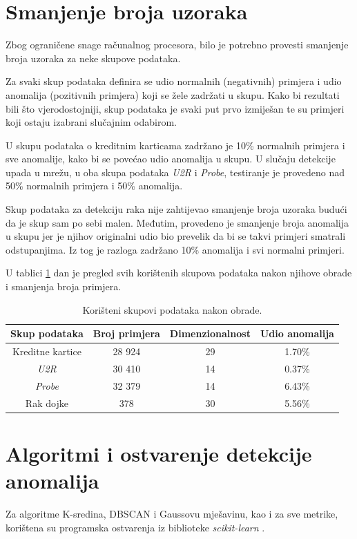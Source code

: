 \documentclass[utf8, diplomski, numeric]{fer}
\begin{document}
\section{Smanjenje broja uzoraka}
Zbog ograničene snage računalnog procesora, bilo je potrebno provesti smanjenje broja uzoraka za neke skupove podataka. 

Za svaki skup podataka definira se udio normalnih (negativnih) primjera i udio anomalija (pozitivnih primjera) koji se žele zadržati u skupu. Kako bi rezultati bili što vjerodostojniji, skup podataka je svaki put prvo izmiješan te su primjeri koji ostaju izabrani slučajnim odabirom. 

U skupu podataka o kreditnim karticama zadržano je 10\% normalnih primjera i sve anomalije, kako bi se povećao udio anomalija u skupu. U slučaju detekcije upada u mrežu, u oba skupa podataka \textit{U2R} i \textit{Probe}, testiranje je provedeno nad 50\% normalnih primjera i 50\% anomalija.

Skup podataka za detekciju raka nije zahtijevao smanjenje broja uzoraka budući da je skup sam po sebi malen. Međutim, provedeno je smanjenje broja anomalija u skupu jer je njihov originalni udio bio prevelik da bi se takvi primjeri smatrali odstupanjima. Iz tog je razloga zadržano 10\% anomalija i svi normalni primjeri.

U tablici \ref{tab:datasets2} dan je pregled svih korištenih skupova podataka nakon njihove obrade i smanjenja broja primjera.

\begin{table}[h!]
  \begin{center}
    \caption{Korišteni skupovi podataka nakon obrade.}
    \label{tab:datasets2}
    \begin{tabular}{c|c|c|c} 
      \textbf{Skup podataka} & \textbf{Broj primjera} & \textbf{Dimenzionalnost}  & \textbf{Udio anomalija}\\
      \hline
      Kreditne kartice & 28 924 & 29 & 1.70\% \\
      \textit{U2R} & 30 410 & 14 & 0.37\% \\
      \textit{Probe} & 32 379 & 14 & 6.43\% \\
      Rak dojke & 378 & 30 & 5.56\% \\
     \end{tabular}
  \end{center}
\end{table}


\section{Algoritmi i ostvarenje detekcije anomalija}
Za algoritme K-sredina, DBSCAN i Gaussovu mješavinu, kao i za sve metrike, korištena su programska ostvarenja iz biblioteke \textit{scikit-learn} \cite{scikit-learn}.
\end{document}
